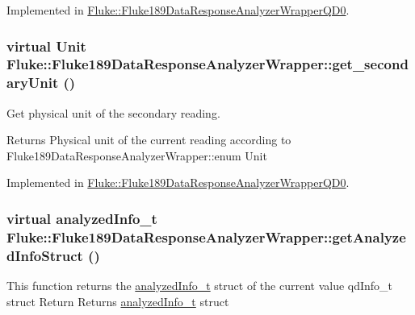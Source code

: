 Implemented in \hyperlink{classFluke_1_1Fluke189DataResponseAnalyzerWrapperQD0_aa46ac22750b412df37ae24db84fab138}{Fluke::Fluke189DataResponseAnalyzerWrapperQD0}.\hypertarget{classFluke_1_1Fluke189DataResponseAnalyzerWrapper_a8c24a1f3d5abae862ffa06a3a7ac44f1}{
\subsubsection[{get\_\-secondaryUnit}]{\setlength{\rightskip}{0pt plus 5cm}virtual {\bf Unit} Fluke::Fluke189DataResponseAnalyzerWrapper::get\_\-secondaryUnit ()}}
\label{classFluke_1_1Fluke189DataResponseAnalyzerWrapper_a8c24a1f3d5abae862ffa06a3a7ac44f1}
Get physical unit of the secondary reading. \begin{DoxyReturn}{Returns}
Physical unit of the current reading according to Fluke189DataResponseAnalyzerWrapper::enum Unit 
\end{DoxyReturn}


Implemented in \hyperlink{classFluke_1_1Fluke189DataResponseAnalyzerWrapperQD0_a3f1bdb92d10f341c8b22fa8ee95600b5}{Fluke::Fluke189DataResponseAnalyzerWrapperQD0}.\hypertarget{classFluke_1_1Fluke189DataResponseAnalyzerWrapper_a006925b794ce1cd11ca13668fbcf5b64}{
\subsubsection[{getAnalyzedInfoStruct}]{\setlength{\rightskip}{0pt plus 5cm}virtual {\bf analyzedInfo\_\-t} Fluke::Fluke189DataResponseAnalyzerWrapper::getAnalyzedInfoStruct ()}}
\label{classFluke_1_1Fluke189DataResponseAnalyzerWrapper_a006925b794ce1cd11ca13668fbcf5b64}
This function returns the \hyperlink{structFluke_1_1Fluke189DataResponseAnalyzerWrapper_1_1analyzedInfo__t}{analyzedInfo\_\-t} struct of the current value qdInfo\_\-t struct Return Returns \hyperlink{structFluke_1_1Fluke189DataResponseAnalyzerWrapper_1_1analyzedInfo__t}{analyzedInfo\_\-t} struct 

